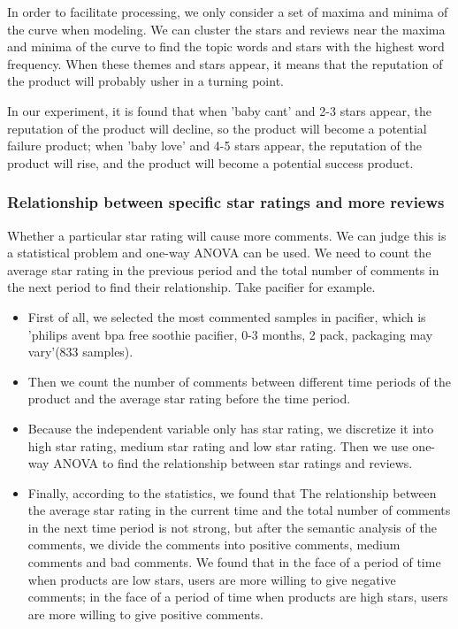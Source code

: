 \documentclass{mcmthesis}
\begin{document}
In order to facilitate processing, we only consider a set of maxima and minima of the curve when modeling. We can cluster the stars and reviews near the maxima and minima of the curve to find the topic words and stars with the highest word frequency. When these themes and stars appear, it means that the reputation of the product will probably usher in a turning point.

In our experiment, it is found that when 'baby cant' and 2-3 stars appear, the reputation of the product will decline, so the product will become a potential failure product; when 'baby love' and 4-5 stars appear, the reputation of the product will rise, and the product will become a potential success product.

\subsubsection{Relationship between specific star ratings and more reviews}
Whether a particular star rating will cause more comments. We can judge this is a statistical problem and one-way ANOVA can be used. We need to count the average star rating in the previous period and the total number of comments in the next period to find their relationship. Take pacifier for example.
\begin{itemize}
	\item First of all, we selected the most commented samples in pacifier, which is 'philips avent bpa free soothie pacifier, 0-3 months, 2 pack, packaging may vary'(833 samples).
	\item Then we count the number of comments between different time periods of the product and the average star rating before the time period.
	\item Because the independent variable only has star rating, we discretize it into high star rating, medium star rating and low star rating. Then we use one-way ANOVA to find the relationship between star ratings and reviews.
	\item Finally, according to the statistics, we found that
	The relationship between the average star rating in the current time and the total number of comments in the next time period is not strong, but after the semantic analysis of the comments, we divide the comments into positive comments, medium comments and bad comments. We found that in the face of a period of time when products are low stars, users are more willing to give negative comments; in the face of a period of time when products are high stars, users are more willing to give positive comments.
\end{itemize}
\end{document}
